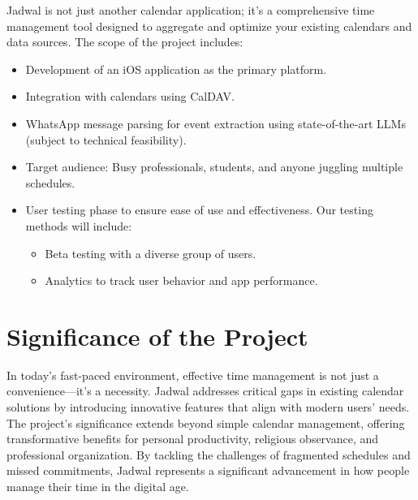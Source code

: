 \documentclass[12pt,a4paper,twoside]{report}
\begin{document}
Jadwal is not just another calendar application; it's a comprehensive time management tool designed to aggregate and optimize your existing calendars and data sources. The scope of the project includes:
\begin{itemize}
    \item Development of an iOS application as the primary platform.
    \item Integration with calendars using CalDAV.
    \item WhatsApp message parsing for event extraction using state-of-the-art LLMs (subject to technical feasibility).
    \item Target audience: Busy professionals, students, and anyone juggling multiple schedules.
    \item User testing phase to ensure ease of use and effectiveness. Our testing methods will include:
          \begin{itemize}
              \item Beta testing with a diverse group of users.
              \item Analytics to track user behavior and app performance.
          \end{itemize}
\end{itemize}


\section{Significance of the Project}

In today's fast-paced environment, effective time management is not just a convenience—it's a necessity. Jadwal addresses critical gaps in existing calendar solutions by introducing innovative features that align with modern users' needs. The project's significance extends beyond simple calendar management, offering transformative benefits for personal productivity, religious observance, and professional organization. By tackling the challenges of fragmented schedules and missed commitments, Jadwal represents a significant advancement in how people manage their time in the digital age.
\end{document}
